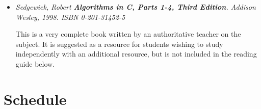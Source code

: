 \documentclass[a4paper]{article}
\begin{document}
\begin{description}
\begin{itemize}
    \item
      \emph{
        Sedgewick, Robert
        \textbf{Algorithms in C, \emph{Parts 1-4, Third Edition}}.
        Addison Wesley, 1998.
        ISBN 0-201-31452-5
      }
      
      This is a very complete book written by an authoritative teacher on the subject.
      It is suggested as a resource for students wishing to study independently with an additional resource, but is not included in the reading guide below.
      
  \end{itemize}
  
\end{description}



\section{Schedule}
\end{document}
